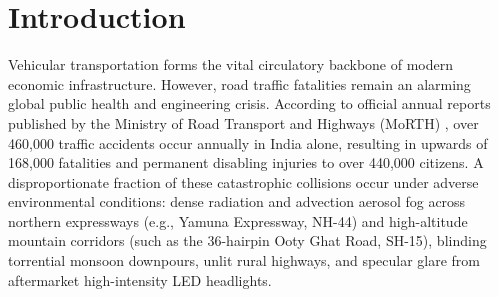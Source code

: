 \documentclass[conference]{IEEEtran}
\begin{document}
\section{Introduction}
Vehicular transportation forms the vital circulatory backbone of modern economic infrastructure. However, road traffic fatalities remain an alarming global public health and engineering crisis. According to official annual reports published by the Ministry of Road Transport and Highways (MoRTH) \cite{morth2024report}, over 460,000 traffic accidents occur annually in India alone, resulting in upwards of 168,000 fatalities and permanent disabling injuries to over 440,000 citizens. A disproportionate fraction of these catastrophic collisions occur under adverse environmental conditions: dense radiation and advection aerosol fog across northern expressways (e.g., Yamuna Expressway, NH-44) and high-altitude mountain corridors (such as the 36-hairpin Ooty Ghat Road, SH-15), blinding torrential monsoon downpours, unlit rural highways, and specular glare from aftermarket high-intensity LED headlights.
\end{document}
